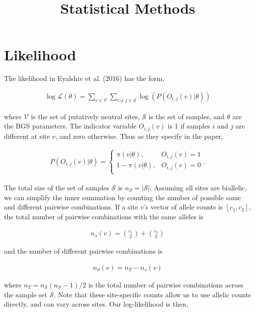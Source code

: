 \documentclass[11pt]{article}
\title{Statistical Methods}
\begin{document}
\maketitle


\section*{Likelihood}

The likelihood in Eyalshiv et al. (2016) has the form,

\begin{align}
  \log\mathcal{L}(\theta) = \sum_{v \in \mathcal{V}} \sum_{i \ne j \in \mathcal{S}} \log(P(O_{i,j}(v) | \theta))
\end{align}

where $\mathcal{V}$ is the set of putatively neutral sites, $\mathcal{S}$ is
the set of samples, and $\theta$ are the BGS parameters. The indicator variable
$O_{i,j}(v)$ is 1 if samples $i$ and $j$ are different at site $v$, and zero
otherwise. Thus as they specify in the paper, 

\begin{align}
  P(O_{i,j}(v) | \theta) = 
    \begin{cases}
      \pi(v | \theta), & O_{i,j}(v) = 1 \\
      1-\pi(v | \theta), & O_{i,j}(v) = 0 \\
    \end{cases}.
\end{align}

The total size of the set of samples $\mathcal{S}$ is $n_\mathcal{S} =
|\mathcal{S}|$. Assuming all sites are biallelic, we can simplify the inner
summation by counting the number of possible same and different pairwise
combinations. If a site $v$'s vector of allele counts is $[c_1, c_2]$, the
total number of pairwise combinations with the same alleles is

\begin{align}
  n_s(v) = {c_1 \choose 2} + {c_2 \choose 2}
\end{align}

and the number of different pairwise combinations is 

\begin{align}
  n_d(v) = n_T - n_s(v)
\end{align}

where $n_T = n_\mathcal{S} (n_\mathcal{S} - 1) / 2$  is the total number of
pairwise combinations across the sample set $\mathcal{S}$. Note that these
site-specific counts allow us to use allelic counts directly, and can vary
across sites. Our log-likelihood is then,
\end{document}
